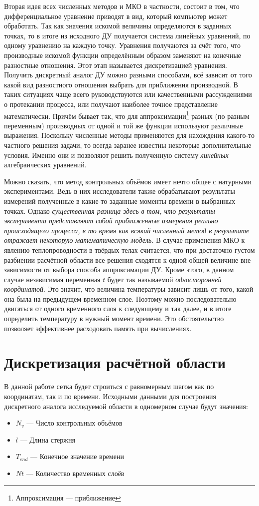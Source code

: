 \documentclass[oneside, final, 14pt]{report}
\begin{document}
Вторая идея всех численных методов и МКО в частности, состоит в том, что дифференциальное уравнение приводят в вид, который компьютер может обработать. Так как значения искомой величины определяются в заданных точках, то в итоге из исходного ДУ получается система линейных уравнений, по одному уравнению на каждую точку. Уравнения получаются за счёт того, что производные искомой функции определённым образом заменяют на конечные разностные отношения. Этот этап называется дискретизацией уравнения. Получить дискретный аналог ДУ  можно разными способами, всё зависит от того какой вид разностного отношения выбрать для приближения производной. В таких ситуациях чаще всего руководствуются или качественными рассуждениями о протекании процесса, или получают наиболее точное представление математически. Причём бывает так, что для аппроксимации\footnote{Аппроксимация --- приближение} разных (по разным переменным) производных от одной и той же функции используют различные выражения. Поскольку численные методы применяются для нахождения какого-то частного решения задачи, то всегда заранее известны некоторые дополнительные условия. Именно они и позволяют решить полученную систему \emph{линейных} алгебраических уравнений. 


Можно сказать, что метод контрольных объёмов имеет нечто общее с натурными экспериментами. Ведь в них исследователи также обрабатывают результаты измерений полученные в какие-то заданные моменты времени в выбранных точках. Однако \emph{существенная разница здесь в том, что результаты эксперимента представляют собой приближенные измерения реально происходящего процесса, в то время как всякий численный метод в результате отражает некоторую математическую модель.} В случае применения МКО к явлению теплопроводности в твёрдых телах считается, что при достаточно густом разбиении расчётной области все решения сходятся к одной общей величине вне зависимости от выбора способа аппроксимации ДУ. Кроме этого, в данном случае независимая переменная $t$ будет так называемой \emph{односторонней координатой}. Это значит, что величина температуры зависит лишь от того, какой она была на предыдущем временном слое. Поэтому можно последовательно двигаться от одного временного слоя к следующему и так далее, и в итоге определить температуру в нужный момент времени. Это обстоятельство позволяет эффективнее расходовать память при вычислениях. 

\section{Дискретизация расчётной области}
В данной работе сетка будет строиться с равномерным шагом как по координатам, так и по времени. Исходными данными для построения дискретного аналога исследуемой области в одномерном случае будут значения: 
\begin{itemize}
 \item $N_v$ --- Число контрольных объёмов
 \item $l$ --- Длина стержня
 \item $T_{end}$ --- Конечное значение времени
 \item $Nt$ --- Количество временных слоёв
 \label{FVA_defenitions}
\end{itemize}
\end{document}
